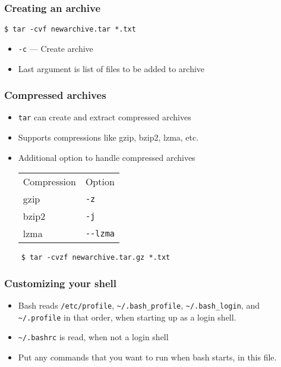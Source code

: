 \documentclass[12pt,compress]{beamer}
\begin{document}
\begin{frame}[fragile]
\frametitle{Creating an archive}
\begin{lstlisting}
$ tar -cvf newarchive.tar *.txt
\end{lstlisting} %
\begin{itemize}
\item \texttt{-c} --- Create archive
\item Last argument is list of files to be added to archive
\end{itemize}
\end{frame}

\begin{frame}[fragile]
  \frametitle{Compressed archives}
  \begin{itemize}
  \item \texttt{tar} can create and extract compressed archives
  \item Supports compressions like gzip, bzip2, lzma, etc.
  \item Additional option to handle compressed archives
    \begin{center}
      \begin{tabular}{ll}
        Compression      &  Option   \\
        gzip   &  \texttt{-z}        \\
        bzip2  &  \texttt{-j}        \\
        lzma   &  \texttt{-{}-lzma}  \\
      \end{tabular}
    \end{center}
  \end{itemize}
  \begin{lstlisting}
    $ tar -cvzf newarchive.tar.gz *.txt
  \end{lstlisting} %
\end{frame}


\begin{frame}
\frametitle{Customizing your shell}
\begin{itemize}
\item Bash reads \texttt{/etc/profile},
  \texttt{\textasciitilde{}/.bash\_profile},
  \texttt{\textasciitilde{}/.bash\_login}, and
  \texttt{\textasciitilde{}/.profile} in that order, when starting
  up as a login shell. 
\item \texttt{\textasciitilde{}/.bashrc} is read, when not a login
  shell 
\item Put any commands that you want to run when bash starts, in this
  file. 
\end{itemize}
\end{frame}

\end{document}
